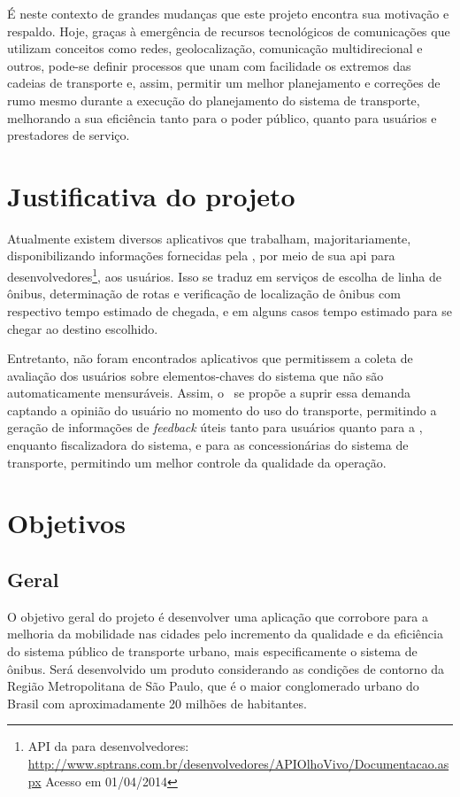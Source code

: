 É neste contexto de grandes mudanças que este projeto encontra sua motivação e respaldo. Hoje, graças à emergência de recursos tecnológicos de comunicações que utilizam conceitos como redes, geolocalização, comunicação multidirecional e outros, pode-se definir processos que unam com facilidade os extremos das cadeias de transporte e, assim, permitir um melhor planejamento e correções de rumo mesmo durante a execução do planejamento do sistema de transporte, melhorando a sua eficiência tanto para o poder público, quanto para usuários e prestadores de serviço.

\section{Justificativa do projeto}\label{sec:justificativa}
Atualmente existem diversos aplicativos que trabalham, majoritariamente, disponibilizando informações fornecidas pela \sptrans, por meio de sua \gls{api} para desenvolvedores\footnote{API da \sptrans para desenvolvedores: \url{http://www.sptrans.com.br/desenvolvedores/APIOlhoVivo/Documentacao.aspx} Acesso em 01/04/2014}, aos usuários. 
Isso se traduz em serviços de escolha de linha de ônibus, determinação de rotas e verificação de localização de ônibus com respectivo tempo estimado de chegada, e em alguns casos tempo estimado para se chegar ao destino escolhido.

Entretanto, não foram encontrados aplicativos que permitissem a coleta de avaliação dos usuários sobre elementos-chaves do sistema que não são automaticamente mensuráveis. Assim, o \trilhasp~se propõe a suprir essa demanda captando a opinião do usuário no momento do uso do transporte, permitindo a geração de informações de \textit{feedback} úteis tanto para usuários quanto para a \sptrans, enquanto fiscalizadora do sistema, e para as concessionárias do sistema de transporte, permitindo um melhor controle da qualidade da operação.

\section{Objetivos}\label{sec:objetivos}
\subsection{Geral}\label{subsec:objGerais}
O objetivo geral do projeto é desenvolver uma aplicação que corrobore para a melhoria da mobilidade nas cidades pelo incremento da qualidade e da eficiência do sistema público de transporte urbano, mais especificamente o sistema de ônibus. Será desenvolvido um produto considerando as condições de contorno da Região Metropolitana de São Paulo, que é o maior conglomerado urbano do Brasil com aproximadamente 20 milhões de habitantes.

